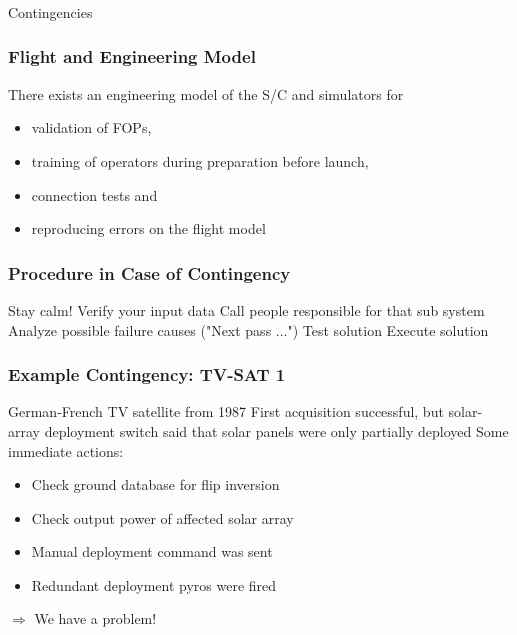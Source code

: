 \documentclass[12pt,utf8,notheorems,compress]{beamer}
\begin{document}
\begin{frame}
  \frametitle{}
  \vfill
  \begin{center}
    \Large Contingencies
  \end{center}
  \vfill
\end{frame}

\begin{frame}
  \frametitle{Flight and Engineering Model}
  \pause
  There exists an engineering model of the S/C and simulators for \pause
  \begin{itemize}
  \item validation of FOPs, \pause
  \item training of operators during preparation before launch, \pause
  \item connection tests and \pause
  \item reproducing errors on the flight model
  \end{itemize}
\end{frame}

\begin{frame}
  \frametitle{Procedure in Case of Contingency}
  \pause
  \vfill
  Stay calm! \pause
  \vfill
  Verify your input data \pause
  \vfill
  Call people responsible for that sub system \pause
  \vfill
  Analyze possible failure causes ("Next pass ...") \pause
  \vfill
  Test solution \pause
  \vfill
  Execute solution
\end{frame}

\begin{frame}
  \frametitle{Example Contingency: TV-SAT 1}
  \pause
  \vfill
  German-French TV satellite from 1987 \pause
  \vfill
  First acquisition successful, but solar-array deployment switch said that solar panels were only partially deployed \pause
  Some immediate actions:
  \begin{itemize}
  \item Check ground database for flip inversion \pause
  \item Check output power of affected solar array \pause
  \item Manual deployment command was sent \pause
  \item Redundant deployment pyros were fired \pause
  \end{itemize}
  \vfill
  $\Longrightarrow$ We have a problem!
\end{frame}
\end{document}

